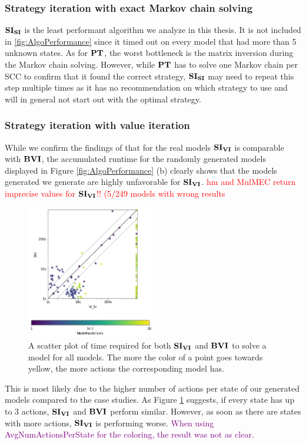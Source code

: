 \subsubsection*{Strategy iteration with exact Markov chain solving}
$\mathbf{SI_{SI}}$ is the least performant algorithm we analyze in this thesis.
It is not included in \ref{fig:AlgoPerformance} since it timed out on every model that had more than 5 unknown states.
As for $\mathbf{PT}$, the worst bottleneck is the matrix inversion during the Markov chain solving.
However, while $\mathbf{PT}$ has to solve one Markov chain per SCC to confirm that it found the correct strategy,
$\mathbf{SI_{SI}}$ may need to repeat this step multiple times as it has no recommendation on which strategy to use and will in general not start out with the optimal strategy.

\subsubsection*{Strategy iteration with value iteration}
While we confirm the findings of \cite{gandalf} that for the real models $\SI$ is comparable with $\BVI$, 
the accumulated runtime for the randomly generated models displayed in Figure \ref{fig:AlgoPerformance} (b) clearly shows that 
the models generated we generate are highly unfavorable for $\SI$.
\textcolor{red}{hm and MulMEC return imprecise values for $\SI$!! (5/249 models with wrong results}

\begin{figure}[h!]
    \centering
    \includegraphics[width=0.5\textwidth]{figures/colorScatter_SI_VI.jpg}
    \caption[$\SI$ compared to $\BVI$ based on MaxNumActions]{
        A scatter plot of time required for both $\SI$ and $\BVI$ to solve a model for all models.
        The more the color of a point goes towards yellow, the more actions the corresponding model has.
    }
    \label{fig:colorScatterSi}
\end{figure}
\FloatBarrier
This is most likely due to the higher number of actions per state of our generated models compared to the case studies.
As Figure \ref{fig:colorScatterSi} suggests, if every state has up to 3 actions, $\SI$ and $\BVI$ perform similar.
However, as soon as there are states with more  actions, $\SI$ is performing worse.
\textcolor{purple}{When using AvgNumActionsPerState for the coloring, the result was not as clear.}

